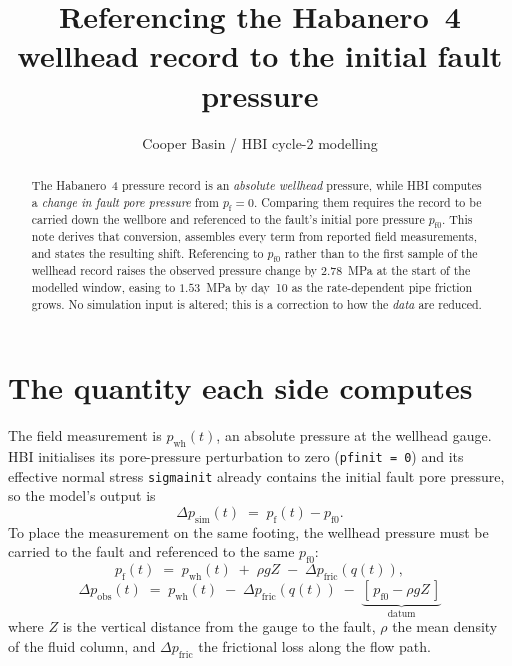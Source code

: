 \documentclass[11pt]{article}
\title{Referencing the Habanero~4 wellhead record to the initial fault
       pressure}
\author{Cooper Basin / HBI cycle-2 modelling}
\date{}
\newcommand{\code}[1]{\texttt{#1}}
\newcommand{\pf}{p_{\mathrm{f}}}
\newcommand{\pfz}{p_{\mathrm{f}0}}
\newcommand{\pwh}{p_{\mathrm{wh}}}
\begin{document}
\maketitle

\begin{abstract}
\noindent
The Habanero~4 pressure record is an \emph{absolute wellhead} pressure, while
HBI computes a \emph{change in fault pore pressure} from $\pf = 0$. Comparing
them requires the record to be carried down the wellbore and referenced to the
fault's initial pore pressure $\pfz$. This note derives that conversion,
assembles every term from reported field measurements, and states the resulting
shift. Referencing to $\pfz$ rather than to the first sample of the wellhead
record raises the observed pressure change by $2.78$~MPa at the start of the
modelled window, easing to $1.53$~MPa by day~10 as the rate-dependent pipe
friction grows. No simulation input is altered; this is a correction to how the
\emph{data} are reduced.
\end{abstract}

\section{The quantity each side computes}

The field measurement is $\pwh(t)$, an absolute pressure at the wellhead gauge.
HBI initialises its pore-pressure perturbation to zero (\code{pfinit = 0}) and
its effective normal stress \code{sigmainit} already contains the initial fault
pore pressure, so the model's output is
\begin{equation}
  \Delta p_{\mathrm{sim}}(t) \;=\; \pf(t) - \pfz .
\end{equation}
To place the measurement on the same footing, the wellhead pressure must be
carried to the fault and referenced to the same $\pfz$:
\begin{equation}
  \pf(t) \;=\; \pwh(t) \;+\; \rho g Z \;-\; \Delta p_{\mathrm{fric}}\!\left(q(t)\right),
  \label{eq:carry}
\end{equation}
\begin{equation}
  \boxed{\;\Delta p_{\mathrm{obs}}(t) \;=\; \pwh(t)
         \;-\; \Delta p_{\mathrm{fric}}\!\left(q(t)\right)
         \;-\; \underbrace{\left[\,\pfz - \rho g Z\,\right]}_{\textstyle \text{datum}}\;}
  \label{eq:dp}
\end{equation}
where $Z$ is the vertical distance from the gauge to the fault, $\rho$ the mean
density of the fluid column, and $\Delta p_{\mathrm{fric}}$ the frictional loss
along the flow path.
\end{document}
